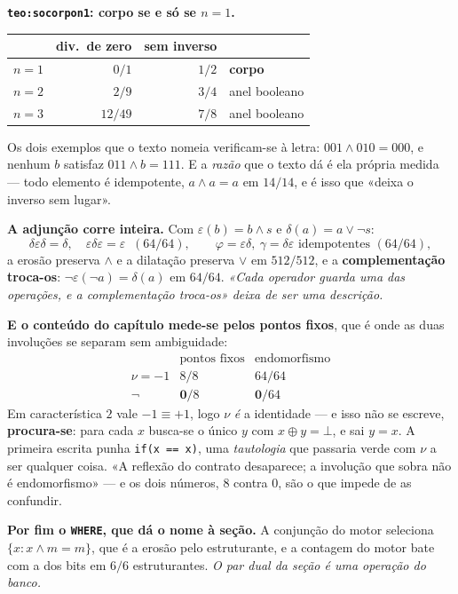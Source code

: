 \documentclass[11pt,a4paper]{article}
\newcommand{\code}[1]{\texttt{\small #1}}
\begin{document}
\medskip\noindent\textbf{\code{teo:socorpon1}: corpo se e só se $n=1$.}
\begin{center}
\begin{tabular}{@{}lrrl@{}}
\toprule
 & div.\ de zero & sem inverso & \\
\midrule
$n=1$ & $0/1$ & $1/2$ & \textbf{corpo}\\
$n=2$ & $2/9$ & $3/4$ & anel booleano\\
$n=3$ & $12/49$ & $7/8$ & anel booleano\\
\bottomrule
\end{tabular}
\end{center}
Os dois exemplos que o texto nomeia verificam-se à letra: $001\wedge010=000$, e
nenhum $b$ satisfaz $011\wedge b=111$. E a \emph{razão} que o texto dá é ela própria
medida --- todo elemento é idempotente, $a\wedge a=a$ em $14/14$, e é isso que
«deixa o inverso sem lugar».

\medskip\noindent\textbf{A adjunção corre inteira.} Com $\varepsilon(b)=b\wedge s$ e
$\delta(a)=a\vee\neg s$:
\[
\delta\varepsilon\delta=\delta,\quad \varepsilon\delta\varepsilon=\varepsilon
\;\;(64/64),\qquad
\varphi=\varepsilon\delta,\ \gamma=\delta\varepsilon \text{ idempotentes }(64/64),
\]
a erosão preserva $\wedge$ e a dilatação preserva $\vee$ em $512/512$, e a
\textbf{complementação troca-os}: $\neg\varepsilon(\neg a)=\delta(a)$ em $64/64$.
\emph{«Cada operador guarda uma das operações, e a complementação troca-os» deixa de
ser uma descrição.}

\medskip\noindent\textbf{E o conteúdo do capítulo mede-se pelos pontos fixos}, que é
onde as duas involuções se separam sem ambiguidade:
\[
\begin{array}{lcc}
 & \text{pontos fixos} & \text{endomorfismo}\\
\nu=-1 & 8/8 & 64/64\\
\neg & \mathbf{0}/8 & \mathbf{0}/64
\end{array}
\]
Em característica $2$ vale $-1\equiv+1$, logo $\nu$ \emph{é} a identidade --- e isso
não se escreve, \textbf{procura-se}: para cada $x$ busca-se o único $y$ com
$x\oplus y=\bot$, e sai $y=x$. A primeira escrita punha \code{if(x == x)}, uma
\emph{tautologia} que passaria verde com $\nu$ a ser qualquer coisa. «A reflexão do
contrato desaparece; a involução que sobra não é endomorfismo» --- e os dois números,
$8$ contra $0$, são o que impede de as confundir.

\medskip\noindent\textbf{Por fim o \code{WHERE}, que dá o nome à seção.} A conjunção
do motor seleciona $\{x : x\wedge m=m\}$, que é a erosão pelo estruturante, e a
contagem do motor bate com a dos bits em $6/6$ estruturantes. \emph{O par dual da
seção é uma operação do banco.}
\end{document}
